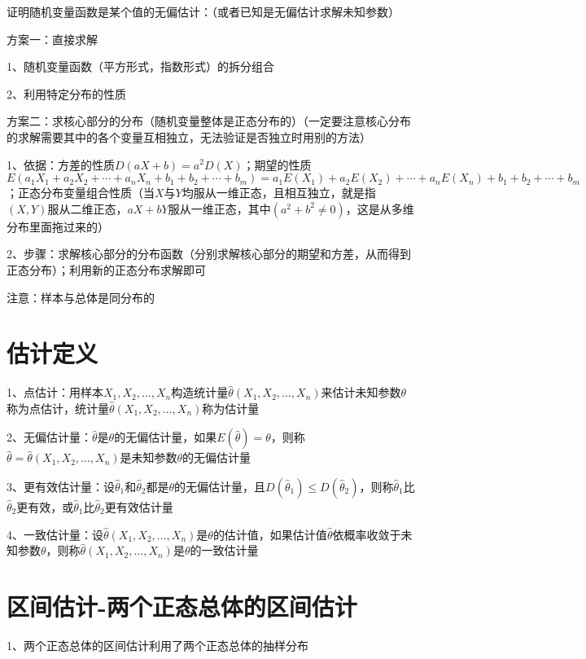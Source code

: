 证明随机变量函数是某个值的无偏估计：（或者已知是无偏估计求解未知参数）

方案一：直接求解

1、随机变量函数（平方形式，指数形式）的拆分组合

2、利用特定分布的性质

方案二：求核心部分的分布（随机变量整体是正态分布的）（一定要注意核心分布的求解需要其中的各个变量互相独立，无法验证是否独立时用别的方法）

1、依据：方差的性质$ D(a X+b)=a^{2} D(X)  $；期望的性质$ E(a_1X_1+a_2X_2+\cdots+a_nX_n+b_1+b_2+\cdots+b_m)=a_1E(X_1)+a_2E(X_2)+\cdots+a_nE(X_n)+b_1+b_2+\cdots+b_m $；正态分布变量组合性质（当$ X $与$ Y $均服从一维正态，且相互独立，就是指$ (X, Y) $服从二维正态，$ a X+b Y $服从一维正态，其中$ \left(a^{2}+b^{2} \neq 0\right) $，这是从多维分布里面拖过来的）

2、步骤：求解核心部分的分布函数（分别求解核心部分的期望和方差，从而得到正态分布）；利用新的正态分布求解即可

注意：样本与总体是同分布的

\section{估计定义}

1、点估计：用样本$ X_1,X_2,\ldots,X_n $构造统计量$ \hat \theta(X_1,X_2,\ldots,X_n) $来估计未知参数$ \theta $称为点估计，统计量$ \hat \theta(X_1,X_2,\ldots,X_n) $称为估计量

2、无偏估计量：$ \hat \theta $是$ \theta $的无偏估计量，如果$ E(\hat \theta)=\theta $，则称$ \hat \theta=\hat \theta(X_1,X_2,\ldots,X_n) $是未知参数$ \theta $的无偏估计量

3、更有效估计量：设$ \hat \theta_1 $和$ \hat \theta_2 $都是$ \theta $的无偏估计量，且$ D(\hat \theta_1) \le D(\hat \theta_2) $，则称$ \hat \theta_1 $比$ \hat \theta_2 $更有效，或$ \hat \theta_1 $比$ \hat \theta_2 $更有效估计量

4、一致估计量：设$ \hat \theta(X_1,X_2,\ldots,X_n) $是$ \theta $的估计值，如果估计值$ \hat \theta $依概率收敛于未知参数$ \theta $，则称$ \hat \theta(X_1,X_2,\ldots,X_n) $是$ \theta $的一致估计量

\section{区间估计-两个正态总体的区间估计}

1、两个正态总体的区间估计利用了两个正态总体的抽样分布

